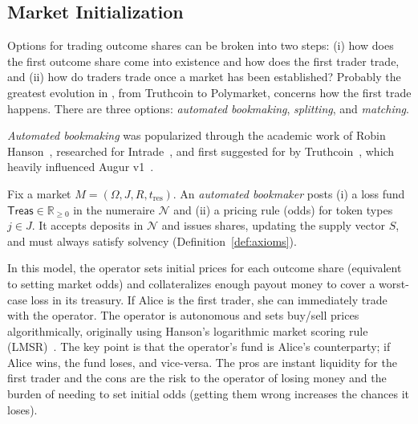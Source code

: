 


\subsection{Market Initialization}\label{wf:init}

Options for trading outcome shares can be broken into two steps: (i) how does the first outcome share come into existence and how does the first trader trade, and (ii) how do traders trade once a market has been established? Probably the greatest evolution in \depms, from Truthcoin to Polymarket, concerns how the first trade happens. There are three options: \textit{automated bookmaking}, \textit{splitting}, and \textit{matching}. 

\textit{Automated bookmaking} was popularized through the academic work of Robin Hanson~\cite{Ha03,Han07b}, researched for Intrade~\cite{McC08}, and first suggested for \depms by Truthcoin~\cite{Sz14}, which heavily influenced Augur v1~\cite{AKPWZ15}. 

\begin{definition}\label{def:autobook}
Fix a market $M=(\Omega,J,R,t_{\mathrm{res}})$. An \emph{automated bookmaker} posts (i) a loss fund $\mathsf{Treas}\in\mathbb{R}_{\ge 0}$ in the numeraire $\mathcal{N}$ and (ii) a pricing rule (odds) for token types $j\in J$. It accepts deposits in $\mathcal{N}$ and issues shares, updating the supply vector $S$, and must always satisfy solvency (Definition~\ref{def:axioms}). 
\end{definition}

In this model, the operator sets initial prices for each outcome share (equivalent to setting market odds) and collateralizes enough payout money to cover a worst-case loss in its treasury. If Alice is the first trader, she can immediately trade with the operator. The operator is autonomous and sets buy/sell prices algorithmically, originally using Hanson's logarithmic market scoring rule (LMSR)~\cite{Han07b}. The key point is that the operator's fund is Alice's counterparty; if Alice wins, the fund loses, and vice-versa. The pros are instant liquidity for the first trader and the cons are the risk to the operator of losing money and the burden of needing to set initial odds (getting them wrong increases the chances it loses). 

